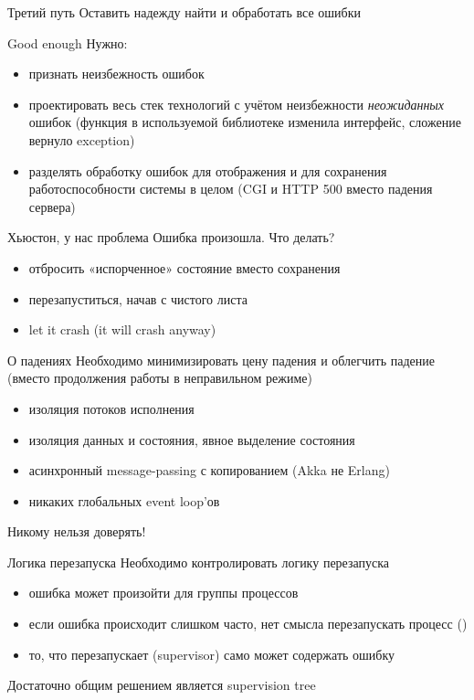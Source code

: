 \documentclass[10pt]{beamer}
\begin{document}
\begin{frame}{Третий путь}
  Оставить надежду найти и обработать все ошибки
\end{frame}

\begin{frame}{Good enough}
  Нужно:
  \begin{itemize}
  \item признать неизбежность ошибок
  \item проектировать весь стек технологий с учётом неизбежности \emph{неожиданных} ошибок (функция в используемой библиотеке изменила интерфейс, сложение вернуло exception)
  \item разделять обработку ошибок для отображения и для сохранения работоспособности системы в целом (CGI и HTTP 500 вместо падения сервера)
  \end{itemize}
\end{frame}

\begin{frame}{Хьюстон, у нас проблема}
  Ошибка произошла. Что делать?
  \begin{itemize}
  \item отбросить «испорченное» состояние вместо сохранения
  \item перезапуститься, начав с чистого листа
  \item let it crash (it will crash anyway)
  \end{itemize}
\end{frame}

\begin{frame}{О падениях}
  Необходимо минимизировать цену падения и облегчить падение (вместо продолжения работы в неправильном режиме)
  \begin{itemize}
  \item изоляция потоков исполнения
  \item изоляция данных и состояния, явное выделение состояния
  \item асинхронный message-passing с копированием (Akka не Erlang)
  \item никаких глобальных event loop'ов
  \end{itemize}
  Никому нельзя доверять!
\end{frame}

\begin{frame}{Логика перезапуска}
  Необходимо контролировать логику перезапуска
  \begin{itemize}
  \item ошибка может произойти для группы процессов
  \item если ошибка происходит слишком часто, нет смысла перезапускать процесс ()
  \item то, что перезапускает (supervisor) само может содержать ошибку
  \end{itemize}
  Достаточно общим решением является supervision tree
\end{frame}
\end{document}
